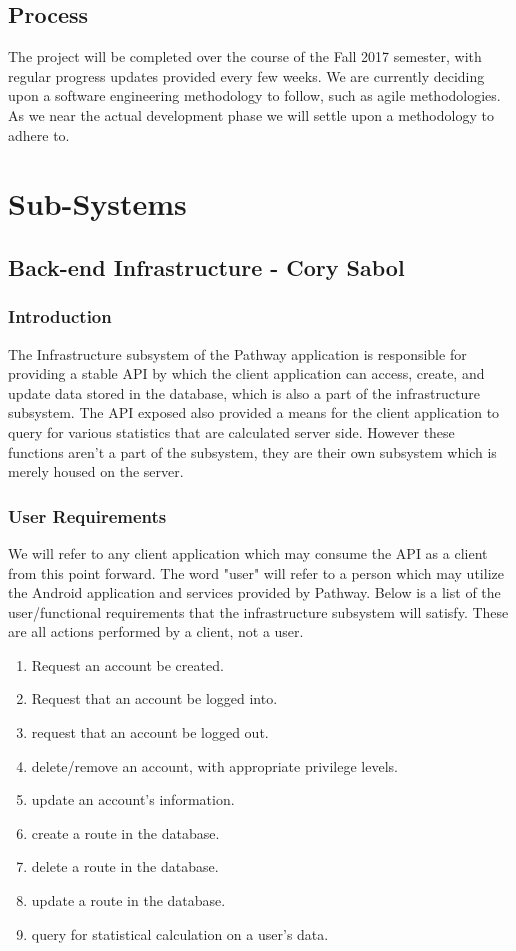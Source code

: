 ﻿\documentclass{article}
\begin{document}
\subsection{Process}
The project will be completed over the course of the Fall 2017 semester, with regular progress updates provided every few weeks. We are currently deciding upon a software engineering methodology to follow, such as agile methodologies. As we near the actual development phase we will settle upon a methodology to adhere to.
    
\section{Sub-Systems}

\subsection{Back-end Infrastructure - Cory Sabol}
\subsubsection{Introduction}
The Infrastructure subsystem of the Pathway application is responsible for providing a stable API by which the client application 
can access, create, and update data stored in the database, which is also a part of the infrastructure subsystem. The API exposed also
provided a means for the client application to query for various statistics that are calculated server side. However these functions aren't
a part of the subsystem, they are their own subsystem which is merely housed on the server.

\subsubsection{User Requirements}
We will refer to any client application which may consume the API as a client from this point forward. The word "user" will refer to a person which may utilize the
Android application and services provided by Pathway. Below is a list of the user/functional requirements that the infrastructure subsystem will satisfy. These are all actions performed by a client, not a user.
\begin{enumerate}
    \item Request an account be created.
    \item Request that an account be logged into.
    \item request that an account be logged out.
    \item delete/remove an account, with appropriate privilege levels.
    \item update an account's information.
    \item create a route in the database.
    \item delete a route in the database.
    \item update a route in the database.
    \item query for statistical calculation on a user's data.
\end{enumerate}
\end{document}

